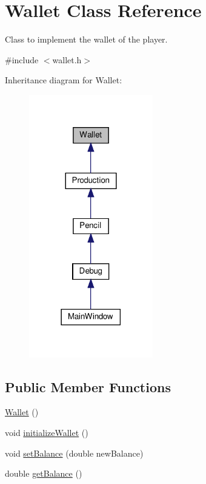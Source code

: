 \hypertarget{classWallet}{}\section{Wallet Class Reference}
\label{classWallet}


Class to implement the wallet of the player.  




{\ttfamily \#include $<$wallet.\+h$>$}



Inheritance diagram for Wallet\+:\nopagebreak
\begin{figure}[H]
\begin{center}
\leavevmode
\includegraphics[width=153pt]{classWallet__inherit__graph}
\end{center}
\end{figure}
\subsection*{Public Member Functions}
\begin{DoxyCompactItemize}
\item 
\hyperlink{classWallet_ad9be9e49244b78db9099fcaeccd1af04}{Wallet} ()
\item 
void \hyperlink{classWallet_a78d2d2fcbaa3e026673692ccb66e4c58}{initialize\+Wallet} ()
\item 
void \hyperlink{classWallet_a84887f86d53ddf090421365c8ac52661}{set\+Balance} (double new\+Balance)
\item 
double \hyperlink{classWallet_a87b3f7dec77a607a67df9c5d5503b3c6}{get\+Balance} ()
\end{DoxyCompactItemize}
